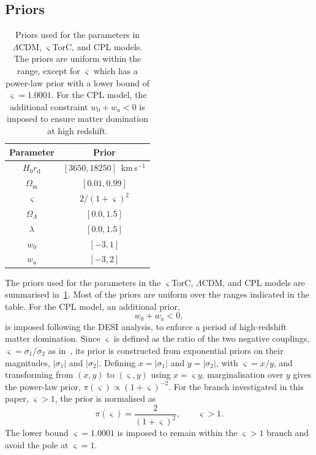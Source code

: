 \documentclass[aps,prd,reprint,preprintnumbers,showpacs,floatfix,nofootinbib,superscriptaddress]{revtex4-2}
\newcommand{\LCDM}{\ensuremath{\Lambda\mathrm{CDM}}}
\newcommand{\CLAUD}[1]{\ifmmode\text{#1}\else#1\fi}
\begin{document}
\subsection{Priors}
\begin{table}[t]
\centering
\begin{tabular}{c|c}
\toprule
Parameter & Prior \\
\midrule
$H_0 r_\mathrm{d}$ & $\left[3650, 18250 \right]$~km\,s$^{-1}$ \\
$\Omega_\mathrm{m}$ & $\left[0.01, 0.99\right]$\\
\midrule
$\varsigma$ & $2/(1+\varsigma)^{2}$\\
$\Omega_\Lambda$ & \CLAUD{$\left[0.0, 1.5\right]$}\\
$\lambda$ & $\left[0.0, 1.5\right]$\\
\midrule
$w_0$ & $\left[-3, 1\right]$ \\
$w_a$ & $\left[-3, 2\right]$ \\
\bottomrule
\end{tabular}
\caption{Priors used for the parameters in \LCDM{}, $\varsigma$TorC, and CPL models. The priors are uniform within the range, except for $\varsigma$ which has a power-law prior with a lower bound of $\varsigma = 1.0001$. For the CPL model, the additional constraint $w_0+w_a<0$ is imposed to ensure matter domination at high redshift.}
\label{tab:stigma-priors}
\end{table}
The priors used for the parameters in the $\varsigma$TorC, \LCDM{}, and CPL models are summarised in~\cref{tab:stigma-priors}. Most of the priors are uniform over the ranges indicated in the table. For the CPL model, an additional prior,
\begin{equation}
		w_0 + w_a < 0,
\end{equation}
is imposed following the DESI analysis, to enforce a period of high-redshift matter domination. Since $\varsigma$ is defined as the ratio of the two negative couplings, $\varsigma=\sigma_1/\sigma_2$ as in~\cite{Barker:2020elg}, its prior is constructed from exponential priors on their magnitudes, $|\sigma_1|$ and $|\sigma_2|$. Defining $x=|\sigma_1|$ and $y=|\sigma_2|$, with $\varsigma=x/y$, and transforming from $(x,y)$ to $(\varsigma,y)$ using $x=\varsigma y$, marginalisation over $y$ gives the power-law prior, $\pi(\varsigma) \propto (1+\varsigma)^{-2}$. For the branch investigated in this paper, $\varsigma>1$, the prior is normalised as
\begin{equation}
		    \pi(\varsigma)=\frac{2}{(1+\varsigma)^2}, \qquad \varsigma>1.
\end{equation}
The lower bound $\varsigma=1.0001$ is imposed to remain within the $\varsigma>1$ branch and avoid the pole at $\varsigma=1$.
\end{document}
